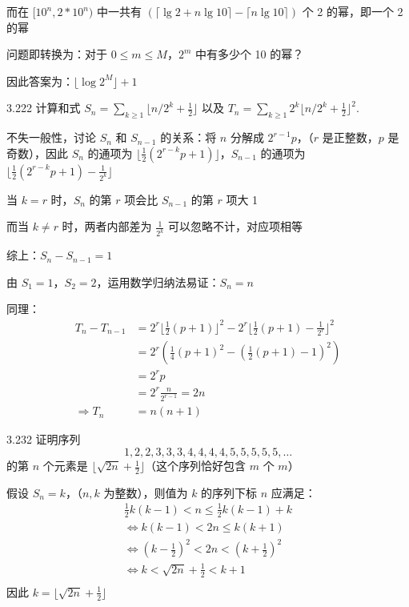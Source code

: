 而在 \( [10^n, 2*10^n) \) 中一共有 \( (\lceil \lg{2} + n \lg{10} \rceil - \lceil n \lg{10} \rceil) \) 个 2 的幂，即一个 2 的幂

问题即转换为：对于 \( 0 \le m \le M \)，\( 2^m \) 中有多少个 10 的幂？

因此答案为：\( \lfloor \log{2^M} \rfloor + 1 \)

\begin{problem}{3.22}{2}
  计算和式 \( S_n = \sum_{k \ge 1} \lfloor n/2^k + \frac{1}{2} \rfloor \) 以及 \( T_n = \sum_{k \ge 1} 2^k \lfloor n/2^k + \frac{1}{2} \rfloor^2 \).
\end{problem}

不失一般性，讨论 \( S_n \) 和 \( S_{n-1} \) 的关系：将 \( n \) 分解成 \( 2^{r-1}p \)，（\( r \) 是正整数，\( p \) 是奇数），因此 \( S_n \) 的通项为 \( \lfloor \frac{1}{2} (2^{r-k} p + 1) \rfloor \)，\( S_{n-1} \) 的通项为 \( \lfloor \frac{1}{2} (2^{r-k} p + 1) - \frac{1}{2^k} \rfloor \)

当 \( k=r \) 时，\( S_n \) 的第 \( r \) 项会比 \( S_{n-1} \) 的第 \( r \) 项大 1

而当 \( k \neq r \) 时，两者内部差为 \( \frac{1}{2^k} \) 可以忽略不计，对应项相等

综上：\( S_n - S_{n-1} = 1 \)

由 \( S_1 = 1 \)，\( S_2 = 2 \)，运用数学归纳法易证：\( S_n = n \)

同理：
\begin{align*}
  T_n - T_{n-1} &= 2^r \lfloor \frac{1}{2} (p+1) \rfloor^2 - 2^r \lfloor \frac{1}{2} (p+1) - \frac{1}{2^r} \rfloor^2 \\
  &= 2^r ( \frac{1}{4} (p+1)^2 - (\frac{1}{2} (p+1) - 1)^2) \\
  &= 2^r p\\
  &= 2^r \frac{n}{2^{r-1}} = 2n \\
  \Rightarrow T_n &= n(n+1)
\end{align*}

\begin{problem}{3.23}{2}
  证明序列
  \[
    1,2,2,3,3,3,4,4,4,4,5,5,5,5,5,\dots
  \]
  的第 \( n \) 个元素是 \( \lfloor \sqrt{2n} + \frac{1}{2} \rfloor \)（这个序列恰好包含 \( m \) 个 \( m \)）
\end{problem}

假设 \( S_n = k \)，（\( n, k \) 为整数），则值为 \( k \) 的序列下标 \( n \) 应满足：
\begin{gather*}
  \frac{1}{2} k (k-1) < n \le \frac{1}{2} k (k-1) + k \\
  \Leftrightarrow k(k-1) < 2n \le k(k+1) \\
  \Leftrightarrow (k - \frac{1}{2})^2 < 2n < (k + \frac{1}{2})^2 \\
  \Leftrightarrow k < \sqrt{2n} + \frac{1}{2} < k + 1 \\
\end{gather*}
因此 \( k = \lfloor \sqrt{2n} + \frac{1}{2} \rfloor \)


